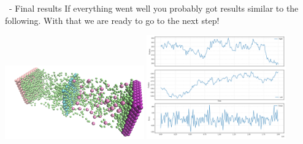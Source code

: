 \begin{frame}[fragile]{\secname}{\subsecname\ - Final results}
If everything went well you probably got results similar to the following. With that we are ready to go to the next step!

\vspace{0.5cm}

{%
\hfill
\includegraphics[width=6cm]{media/006-permeable-membrane-final.png}
\hfill
\includegraphics[width=6cm]{media/008-permeable-membrane-piston-position.png}
\hfill
}
\end{frame}

\endinput